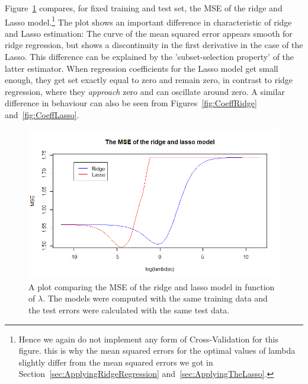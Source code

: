 Figure~\ref{fig:Comparison_ridge_Lasso} compares, for fixed training and test set, the MSE of the ridge and Lasso model.\footnote{Hence we again do not implement any form of Cross-Validation for this figure. this is why the mean squared errors for the optimal values of lambda slightly differ from the mean squared errors we got in Section~\ref{sec:ApplyingRidgeRegression} and~\ref{sec:ApplyingTheLasso}.} The plot shows an important difference in characteristic of ridge and Lasso estimation: The curve of the mean squared error appears smooth for ridge regression, but shows a discontinuity in the first derivative in the case of the Lasso. This difference can be explained by the 'subset-selection property' of the latter estimator. When regression coefficients for the Lasso model get small enough, they get set exactly equal to zero and remain zero, in contrast to ridge regression, where they \textit{approach} zero and can oscillate around zero. A similar difference in behaviour can also be seen from Figures~\ref{fig:CoeffRidge} and~\ref{fig:CoeffLasso}.

\begin{figure}
    \centering
    \includegraphics[width=\linewidth]{Figures/Comparison_ridge_lasso.png}
    \caption{A plot comparing the MSE of the ridge and lasso model in function of $\lambda$. The models were computed with the same training data and the test errors were calculated with the same test data.}
    \label{fig:Comparison_ridge_Lasso}
\end{figure}

